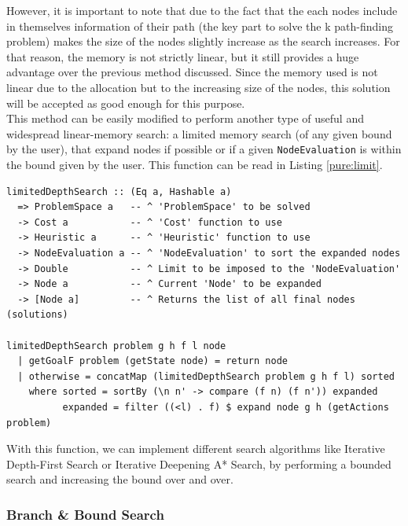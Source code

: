 However, it is important to note that due to the fact that the each nodes
include in themselves information of their path (the key part to solve the k
path-finding problem) makes the size of the nodes slightly increase as the
search increases. For that reason, the memory is not strictly linear, but it
still provides a huge advantage over the previous method discussed. Since the
memory used is not linear due to the allocation but to the increasing size of
the nodes, this solution will be accepted as good enough for this purpose.\\

This method can be easily modified to perform another type of useful and
widespread linear-memory search: a limited memory search (of any given bound by
the user), that expand nodes if possible or if a given \texttt{NodeEvaluation}
is within the bound given by the user. This function can be read in Listing
\ref{pure:limit}.\\

\begin{lstlisting}[style=haskell,
caption=Pure \texttt{limitedDepthSearch} implementation, label=pure:limit]
limitedDepthSearch :: (Eq a, Hashable a)
  => ProblemSpace a   -- ^ 'ProblemSpace' to be solved
  -> Cost a           -- ^ 'Cost' function to use
  -> Heuristic a      -- ^ 'Heuristic' function to use
  -> NodeEvaluation a -- ^ 'NodeEvaluation' to sort the expanded nodes
  -> Double           -- ^ Limit to be imposed to the 'NodeEvaluation'
  -> Node a           -- ^ Current 'Node' to be expanded
  -> [Node a]         -- ^ Returns the list of all final nodes (solutions)

limitedDepthSearch problem g h f l node
  | getGoalF problem (getState node) = return node
  | otherwise = concatMap (limitedDepthSearch problem g h f l) sorted
    where sorted = sortBy (\n n' -> compare (f n) (f n')) expanded
          expanded = filter ((<l) . f) $ expand node g h (getActions problem)
\end{lstlisting}

With this function, we can implement different search algorithms like
Iterative Depth-First Search or Iterative Deepening A* Search, by performing
a bounded search and increasing the bound over and over.\\

\subsubsection{Branch \& Bound Search}

